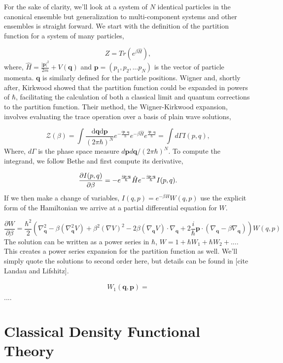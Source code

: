For the sake of clarity, we'll look at a system of $N$ identical particles in the canonical ensemble but generalization to multi-component systems and other ensembles is straight forward. 
We start with the definition of the partition function for a system of many particles,  

\begin{equation}
    Z = Tr(e^{\beta \hat{H}}),
\end{equation} 
where, $\hat{H} = \frac{\vert\mathbf{p}\vert^2}{2m} + V(\mathbf{q})$ and $\mathbf{p} = (p_1, p_2, ...p_N)$ is the vector of particle momenta. 
$\mathbf{q}$ is similarly defined for the particle positions.
Wigner and, shortly after, Kirkwood showed that the partition function could be expanded in powers of $\hbar$, facilitating the calculation of both a classical limit and quantum corrections to the partition function.
Their method, the Wigner-Kirkwood expansion, involves evaluating the trace operation over a basis of plain wave solutions,

\begin{equation}
	\mathcal{Z}(\beta) = \int 
		\frac{\mathrm{d}\mathbf{q} \mathrm{d}\mathbf{p}}{(2\pi \hbar)^N}
		e^{-\frac{i\mathbf{p}\cdot\mathbf{q}}{\hbar}}
		e^{-\beta \hat{H}}
		e^{\frac{i\mathbf{p}\cdot\mathbf{q}}{\hbar}} = \int d\Gamma I(p, q),
\end{equation}
Where, $d\Gamma$ is the phase space measure $d\mathbf{p}d\mathbf{q}/(2\pi\hbar)^N$. To compute the integrand, we follow Bethe and first compute its derivative,

\begin{equation}
	\frac{\partial I(p, q)}{\partial \beta} = -e^{\frac{i\mathbf{p}\cdot\mathbf{q}}{\hbar}}\hat{H}e^{-\frac{i\mathbf{p}\cdot\mathbf{q}}{\hbar}} I(p, q).
\end{equation}
If we then make a change of variables, $I(q, p) = e^{-\beta H}W(q, p)$ use the explicit form of the Hamiltonian we arrive at a partial differential equation for $W$.

\begin{equation}
	\frac{\partial W}{\partial \beta} = \frac{\hbar^2}{2} \left(
		\nabla_{\mathbf{q}}^2 - 
		\beta(\nabla_{\mathbf{q}}^2V) + 
		\beta^2(\nabla V)^2 -
		2\beta(\nabla_{\mathbf{q}} V)\cdot\nabla_{\mathbf{q}} + 
		2 \frac{i}{\hbar}\mathbf{p}\cdot(\nabla_{\mathbf{q}} - \beta\nabla_{\mathbf{q}})
	\right)W(q, p)
\end{equation}
The solution can be written as a power series in $\hbar$, $W = 1 + \hbar W_1 + \hbar W_2 + ...$. This creates a power series expansion for the partition function as well. We'll simply quote the solutions to second order here, but details can be found in [cite Landau and Lifshitz].

\begin{gather}
	W_1(\mathbf{q}, \mathbf{p}) =
\end{gather}
....

\section{Classical Density Functional Theory}


